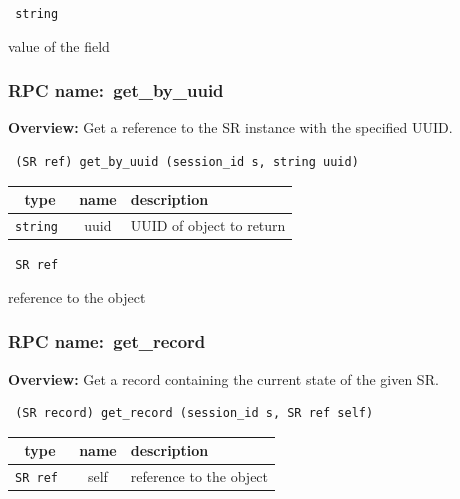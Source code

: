 \vspace{0.3cm}

{\tt 
string
}


value of the field
\vspace{0.3cm}
\vspace{0.3cm}
\vspace{0.3cm}
\subsubsection{RPC name:~get\_by\_uuid}

{\bf Overview:} 
Get a reference to the SR instance with the specified UUID.

\begin{verbatim} (SR ref) get_by_uuid (session_id s, string uuid)\end{verbatim}



 
\vspace{0.3cm}
\begin{tabular}{|c|c|p{7cm}|}
 \hline
{\bf type} & {\bf name} & {\bf description} \\ \hline
{\tt string } & uuid & UUID of object to return \\ \hline 

\end{tabular}

\vspace{0.3cm}

{\tt 
SR ref
}


reference to the object
\vspace{0.3cm}
\vspace{0.3cm}
\vspace{0.3cm}
\subsubsection{RPC name:~get\_record}

{\bf Overview:} 
Get a record containing the current state of the given SR.

\begin{verbatim} (SR record) get_record (session_id s, SR ref self)\end{verbatim}



 
\vspace{0.3cm}
\begin{tabular}{|c|c|p{7cm}|}
 \hline
{\bf type} & {\bf name} & {\bf description} \\ \hline
{\tt SR ref } & self & reference to the object \\ \hline 

\end{tabular}

